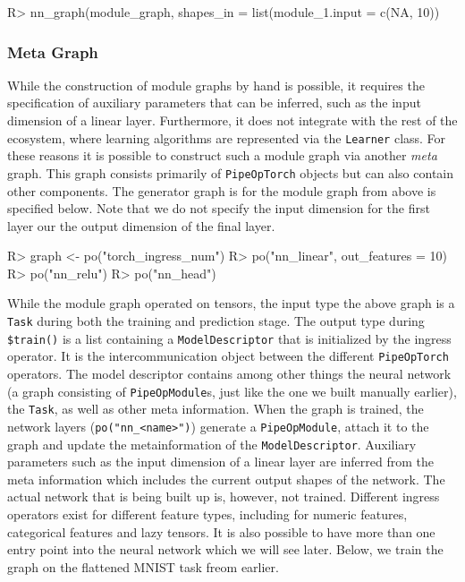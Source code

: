 \documentclass[article, nojss]{jss}
\theoremstyle{definition}
\begin{document}
\begin{CodeInput}
R> nn_graph(module_graph, shapes_in = list(module_1.input = c(NA, 10))
\end{CodeInput}

\subsubsection{Meta Graph}

While the construction of module graphs by hand is possible, it requires the specification of auxiliary parameters that can be inferred, such as the input dimension of a linear layer.
Furthermore, it does not integrate with the rest of the  ecosystem, where learning algorithms are represented via the \texttt{Learner} class.
For these reasons it is possible to construct such a module graph via another \emph{meta} graph.
This graph consists primarily of \texttt{PipeOpTorch} objects but can also contain other components.
The generator graph is for the module graph from above is specified below.
Note that we do not specify the input dimension for the first layer our the output dimension of the final layer.

\begin{CodeInput}
R> graph <- po("torch_ingress_num") %
R>   po("nn_linear", out_features = 10) %
R>   po("nn_relu") %
R>   po("nn_head")  
\end{CodeInput}

While the module graph operated on tensors, the input type the above graph is a \texttt{Task} during both the training and prediction stage. 
The output type during \texttt{\$train()} is a list containing a \texttt{ModelDescriptor} that is initialized by the ingress operator.
It is the intercommunication object between the different \texttt{PipeOpTorch} operators.
The model descriptor contains among other things the neural network (a graph consisting of \texttt{PipeOpModule}s, just like the one we built manually earlier), the \texttt{Task}, as well as other meta information.
When the graph is trained, the network layers (\texttt{po("nn\_<name>")}) generate a \texttt{PipeOpModule}, attach it to the graph and update the metainformation of the \texttt{ModelDescriptor}.
Auxiliary parameters such as the input dimension of a linear layer are inferred from the meta information which includes the current output shapes of the network.
The actual network that is being built up is, however, not trained.
Different ingress operators exist for different feature types, including for numeric features, categorical features and lazy tensors.
It is also possible to have more than one entry point into the neural network which we will see later.
Below, we train the graph on the flattened MNIST task freom earlier. 
\end{document}
